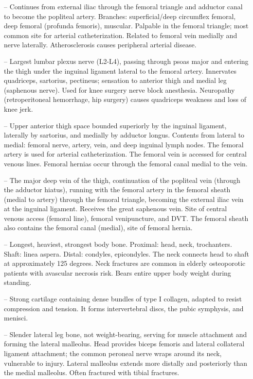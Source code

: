 -- Continues from external iliac through the femoral triangle and adductor canal to become the popliteal artery. Branches: superficial/deep circumflex femoral, deep femoral (profunda femoris), muscular. Palpable in the femoral triangle; most common site for arterial catheterization. Related to femoral vein medially and nerve laterally. Atherosclerosis causes peripheral arterial disease.

-- Largest lumbar plexus nerve (L2-L4), passing through psoas major and entering the thigh under the inguinal ligament lateral to the femoral artery. Innervates quadriceps, sartorius, pectineus; sensation to anterior thigh and medial leg (saphenous nerve). Used for knee surgery nerve block anesthesia. Neuropathy (retroperitoneal hemorrhage, hip surgery) causes quadriceps weakness and loss of knee jerk.

-- Upper anterior thigh space bounded superiorly by the inguinal ligament, laterally by sartorius, and medially by adductor longus. Contents from lateral to medial: femoral nerve, artery, vein, and deep inguinal lymph nodes. The femoral artery is used for arterial catheterization. The femoral vein is accessed for central venous lines. Femoral hernias occur through the femoral canal medial to the vein.

-- The major deep vein of the thigh, continuation of the popliteal vein (through the adductor hiatus), running with the femoral artery in the femoral sheath (medial to artery) through the femoral triangle, becoming the external iliac vein at the inguinal ligament. Receives the great saphenous vein. Site of central venous access (femoral line), femoral venipuncture, and DVT. The femoral sheath also contains the femoral canal (medial), site of femoral hernia.

-- Longest, heaviest, strongest body bone. Proximal: head, neck, trochanters. Shaft: linea aspera. Distal: condyles, epicondyles. The neck connects head to shaft at approximately 125 degrees. Neck fractures are common in elderly osteoporotic patients with avascular necrosis risk. Bears entire upper body weight during standing.

-- Strong cartilage containing dense bundles of type I collagen, adapted to resist compression and tension. It forms intervertebral discs, the pubic symphysis, and menisci.

-- Slender lateral leg bone, not weight-bearing, serving for muscle attachment and forming the lateral malleolus. Head provides biceps femoris and lateral collateral ligament attachment; the common peroneal nerve wraps around its neck, vulnerable to injury. Lateral malleolus extends more distally and posteriorly than the medial malleolus. Often fractured with tibial fractures.

